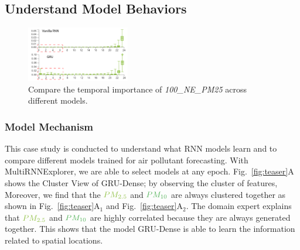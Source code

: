 \subsection{Understand Model Behaviors}
\begin{figure}[t]
	\centering
	\includegraphics[width=0.40\textwidth]{pictures/Evaluation/FI_comparison.pdf}
	\vspace{-3mm}
	\caption{Compare the temporal importance of \textit{100\_NE\_PM25}  across different models. 
	}
	\label{fig:gru_vs_rnn}
	\vspace{-4mm}
\end{figure}

\subsubsection{Model Mechanism}
This case study is conducted to understand what RNN models learn and to compare different models trained for air pollutant forecasting. 
With MultiRNNExplorer, we are able to select models at any epoch. Fig.~\ref{fig:teaser}A shows the Cluster View of GRU-Dense; by observing the cluster of features, 
Moreover, we find that the $\color{PM25Color}{PM_{2.5}}$ and $\color{PM10Color}{PM_{10}}$ are always clustered together as shown in Fig.~\ref{fig:teaser}A$_1$ and Fig.~\ref{fig:teaser}A$_2$.
The domain expert explains that $\color{PM25Color}{PM_{2.5}}$ and $\color{PM10Color}{PM_{10}}$ are highly correlated because they are always generated together.
This  shows that the model GRU-Dense is able to learn the information related to spatial locations.  

